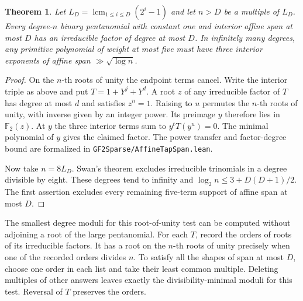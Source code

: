 \documentclass[11pt]{article}
\newtheorem{theorem}{Theorem}
\newcommand{\F}{\mathbb F_2}
\begin{document}
\begin{theorem}\label{thm:affine-tap-span}
Let \(L_D=\operatorname{lcm}_{1\le i\le D}(2^i-1)\) and let
\(n>D\) be a multiple of \(L_D\). Every degree-\(n\) binary
pentanomial with constant one and interior affine span at most \(D\)
has an irreducible factor of degree at most \(D\). In infinitely
many degrees, any primitive polynomial of weight at most five
must have three interior exponents of affine span
\(\gg\sqrt{\log n}\).
\end{theorem}
\begin{proof}
On the \(n\)-th roots of unity the endpoint terms cancel. Write the
interior triple as above and put \(T=1+Y^j+Y^d\). A root \(z\) of
any irreducible factor of \(T\) has degree at most \(d\) and
satisfies \(z^n=1\). Raising to \(u\) permutes the \(n\)-th roots
of unity, with inverse given by an integer power. Its preimage \(y\)
therefore lies in \(\F(z)\). At \(y\) the three interior terms sum
to \(y^t T(y^u)=0\). The minimal polynomial of \(y\) gives the
claimed factor. The power transfer and factor-degree bound are
formalized in \nolinkurl{GF2Sparse/AffineTapSpan.lean}.

Now take \(n=8L_D\). Swan's theorem excludes irreducible trinomials
in a degree divisible by eight. These degrees tend to infinity and
\(\log_2 n\le3+D(D+1)/2\). The first assertion excludes every
remaining five-term support of affine span at most \(D\).
\end{proof}

The smallest degree moduli for this root-of-unity test can be
computed without adjoining a root of the large pentanomial.
For each \(T\), record the orders of roots of its irreducible factors.
It has a root on the \(n\)-th roots of unity precisely when one of
the recorded orders divides \(n\). To satisfy all the shapes of
span at most \(D\), choose one order in each list and take their
least common multiple. Deleting multiples of other answers leaves
exactly the divisibility-minimal moduli for this test. Reversal of
\(T\) preserves the orders.
\end{document}

